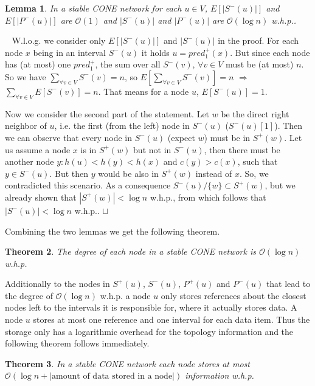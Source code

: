 \documentclass[11pt]{article}
\newtheorem{theorem}{Theorem}[section]
\newtheorem{lemma}[theorem]{Lemma}
\newcommand{\sq}{\hbox{\rlap{$\sqcap$}$\sqcup$}}
\newcommand{\qed}{\hspace*{\fill}\sq}
\newenvironment{proof}{\noindent {\bf Proof.}\ }{\qed\par\vskip 4mm\par}
\begin{document}
\begin{lemma}
In a stable CONE network for each $u\in V$, $E[| S^-(u)|]$ and $E[ |P^-(u)|]$ are $\mathcal O(1)$ and $| S^-(u)|$ and $| P^-(u)|$ are $\mathcal O(\log n)$ w.h.p..
\end{lemma}

\begin{proof}
W.l.o.g. we consider only $E[| S^-(u)|]$ and $|S^-(u)|$ in the proof.
For each node $x$ being in an interval $S^-(u)$ it holds $u=pred^+_1(x)$. But since each node has (at most) one $pred^+_1$, the sum over all $S^-(v)$, $\forall v \in V$ must be (at most) $n$. So we have $\sum_{\forall v \in V} S^-(v)=n$, so  $E[\sum_{\forall v \in V} S^-(v)]=n$ $\Rightarrow$ $\sum_{\forall v \in V}E[ S^-(v)]=n $.
That means for a node $u$, $E[ S^-(u)]=1$.

Now we consider the second part of the statement.
Let $w$ be the direct right neighbor of $u$, i.e. the first (from the left) node in $S^-(u)$ ($S^-(u)[1]$). Then we can observe that every node in $S^-(u)$ (expect $w$) must be in $S^+(w)$. Let us assume a node $x$ is in $S^+(w)$  but not in $S^-(u)$, then there must be another node $y: h(u)<h(y)<h(x)$ and $c(y)>c(x)$, such that $y \in S^-(u)$. But then $y$ would be also in  $S^+(w)$ instead of $x$.
So, we contradicted this scenario. As a consequence  $S^-(u)/\{w\} \subset S^+(w)$, but we already shown that $|S^+(w)|<\log n$ w.h.p., from which follows that $|S^-(u)|<\log n$ w.h.p..
\end{proof}

Combining the two lemmas we get the following theorem.

\begin{theorem}\label{theo:degree}
The degree of each node in a stable CONE network is $\mathcal O(\log n)$ w.h.p.
\end{theorem}

Additionally to the nodes in $ S^+(u)$, $ S^-(u)$, $ P^+(u)$ and $ P^-(u)$ that lead to the degree of $\mathcal O(\log n)$ w.h.p. a node $u$ only stores references about the closest nodes left to the intervals it is responsible for, where it actually stores data. A node $u$ stores at most one reference and one interval for each data item. Thus the storage only has a logarithmic overhead for the topology information and the following theorem follows immediately.

\begin{theorem}\label{theo:storage}
In a stable CONE network each node stores at most $\mathcal O(\log n + |\text{amount of data stored in a node}|)$ information w.h.p.
\end{theorem}
\end{document}
